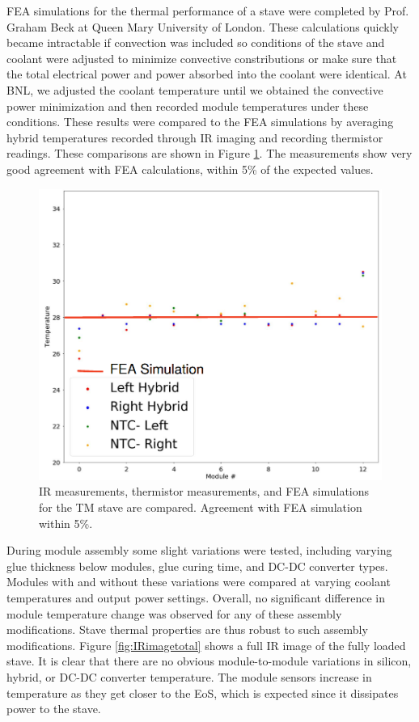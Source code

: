 FEA simulations for the thermal performance of a stave were completed by Prof. Graham Beck at Queen Mary University of London. These calculations quickly became intractable if convection was included so conditions of the stave and coolant were adjusted to minimize convective constributions or make sure that the total electrical power and power absorbed into the coolant were identical. At BNL, we adjusted the coolant temperature until we obtained the convective power minimization and then recorded module temperatures under these conditions. These results were compared to the FEA simulations by averaging hybrid temperatures recorded through IR imaging and recording thermistor readings. These comparisons are shown in Figure \ref{fig:FEAcompare}. The measurements show very good agreement with FEA calculations, within 5\% of the expected values.

\begin{figure}[!h]
        \centering
    \includegraphics[width=.4\textwidth]{Pictures/FEAcompare.png}
    \caption{IR measurements, thermistor measurements, and FEA simulations for the TM stave are compared. Agreement with FEA simulation within 5\%.}
    \label{fig:FEAcompare}
\end{figure} 

During module assembly some slight variations were tested, including varying glue thickness below modules, glue curing time, and DC-DC converter types. Modules with and without these variations were compared at varying coolant temperatures and output power settings. Overall, no significant difference in module temperature change was observed for any of these assembly modifications. Stave thermal properties are thus robust to such assembly modifications. Figure \ref{fig:IRimagetotal} shows a full IR image of the fully loaded stave. It is clear that there are no obvious module-to-module variations in silicon, hybrid, or DC-DC converter temperature. The module sensors increase in temperature as they get closer to the EoS, which is expected since it dissipates power to the stave.

